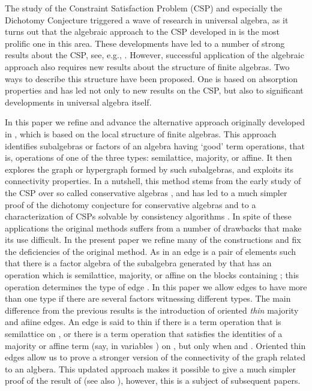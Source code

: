 \documentclass[11pt]{article}
\begin{document}
The study of the Constraint Satisfaction Problem (CSP) and especially the Dichotomy 
Conjecture triggered a wave of research in universal algebra, as it turns out that the
algebraic approach to the CSP developed in \cite{Bulatov05:classifying,Jeavons97:closure}
is the most prolific one in this area. These developments have led to a number of strong results
about the CSP, see, e.g., \cite{Barto11:conservative,Barto14:local,Barto12:near,Bulatov06:3-element,Bulatov11:conservative,Bulatov14:conservative,Bulatov06:simple,Idziak10:few}. However, successful application of the algebraic approach also requires new results 
about the structure of finite algebras. Two ways to describe this structure have been 
proposed. One is based on absorption properties \cite{Barto15:constraint,Barto12:absorbing}
and has led not only to new results on the CSP, but also to significant developments in
universal algebra itself.

In this paper we refine and advance the alternative approach originally developed in 
\cite{Bulatov04:graph,Bulatov11:conjecture,Bulatov08:recent}, which is based on the 
local structure of finite algebras. This 
approach identifies subalgebras or factors of an algebra having `good' term operations,
that is, operations of one of the three types: semilattice, majority, or affine. It then explores 
the graph or hypergraph formed by such subalgebras, and exploits its connectivity properties.
In a nutshell, this method stems from  the early study of the CSP over so called conservative 
algebras \cite{Bulatov11:conservative}, and has led to a much simpler proof of the dichotomy
conjecture for conservative algebras \cite{Bulatov16:conservative} and to a characterization of 
CSPs solvable by consistency algorithms \cite{Bulatov09:bounded}. In spite of these applications
the original methods suffers from a number of drawbacks that make its use difficult. In the
present paper we refine many of the constructions and fix the deficiencies of the original
method. As in \cite{Bulatov04:graph,Bulatov08:recent} an edge is a pair of elements 
such that there is a factor algebra of the subalgebra generated by  that has an
operation which is semilattice, majority, or affine on the blocks containing ; this
operation determines the type of edge . In this paper we allow edges to have more 
than one type if there are several factors witnessing different types. The main difference
from the previous results is the introduction of oriented \emph{thin} majority and afiine edges.
An edge  is said to thin if there is a term operation that is semilattice on , or 
there is a term operation that satisfies the identities of a majority or affine term (say, in
variables ) on , but only when  and . Oriented thin edges
allow us to prove a stronger version of the connectivity of the graph related to an algbera. 
This updated approach makes it possible to give a much simpler proof of the 
result of \cite{Bulatov09:bounded} (see also \cite{Barto14:local}), however, this is a subject
of subsequent papers. 
\end{document}
